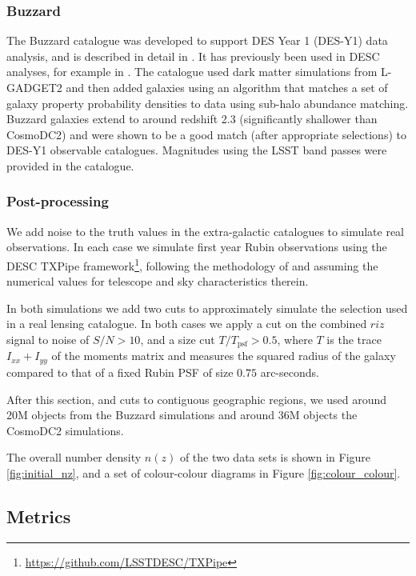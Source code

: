 \documentclass[twocolumn,twocolappendix]{aastex63}
\begin{document}
\subsubsection{Buzzard}

The Buzzard catalogue was developed to support DES Year 1 (DES-Y1)
data analysis, and is described in detail in \citet{buzzard}.
It has previously been used in DESC analyses, for example in \citet{dc1_pz}.
The catalogue used dark
matter simulations from L-GADGET2 \cite{gadget2} and then added galaxies using
an algorithm that matches a set of galaxy
property probability densities to data using sub-halo abundance matching. 
Buzzard galaxies extend to around redshift 2.3 (significantly shallower than CosmoDC2)
and were shown to be a good
match (after appropriate selections) to DES-Y1 observable catalogues.  Magnitudes
using the LSST band passes were provided in the catalogue.

\subsubsection{Post-processing} \label{sec:data-proc}

We add noise to the truth values in the extra-galactic catalogues to simulate real observations.
In each case we simulate first year Rubin observations
using the DESC {\sc TXPipe} framework\footnote{\url{https://github.com/LSSTDESC/TXPipe}}, following the methodology of \citet{ivezic_jones_lupton}
and assuming the numerical values for telescope and sky characteristics therein.

In both simulations we add two cuts to approximately simulate the selection used in a real
lensing catalogue.  In both cases we apply a cut on the combined $riz$ signal to noise of
$S/N > 10$, and a size cut $T / T_\mathrm{psf} > 0.5$, where
$T$ is the trace $I_{xx} + I_{yy}$ of the moments matrix and measures the squared radius of the
galaxy compared to that of a fixed Rubin PSF of size $0.75$ arc-seconds.

After this section, and cuts to contiguous geographic regions, we used around 20M objects from the Buzzard
simulations and around 36M objects the CosmoDC2 simulations.


The overall number density $n(z)$ of the two data sets is shown in Figure \ref{fig:initial_nz},
and a set of colour-colour diagrams  in Figure \ref{fig:colour_colour}.

\subsection{Metrics}
\label{sec:metrics}
\end{document}
